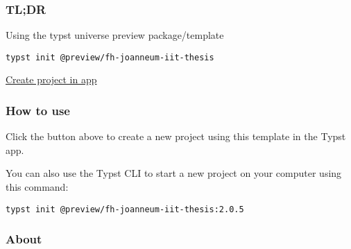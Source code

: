 \subsubsection{TL;DR}\label{tldr}

Using the typst universe preview package/template

\begin{verbatim}
typst init @preview/fh-joanneum-iit-thesis
\end{verbatim}


\href{/app?template=fh-joanneum-iit-thesis&version=2.0.5}{Create project
in app}

\subsubsection{How to use}\label{how-to-use}

Click the button above to create a new project using this template in
the Typst app.

You can also use the Typst CLI to start a new project on your computer
using this command:

\begin{verbatim}
typst init @preview/fh-joanneum-iit-thesis:2.0.5
\end{verbatim}



\subsubsection{About}\label{about}

